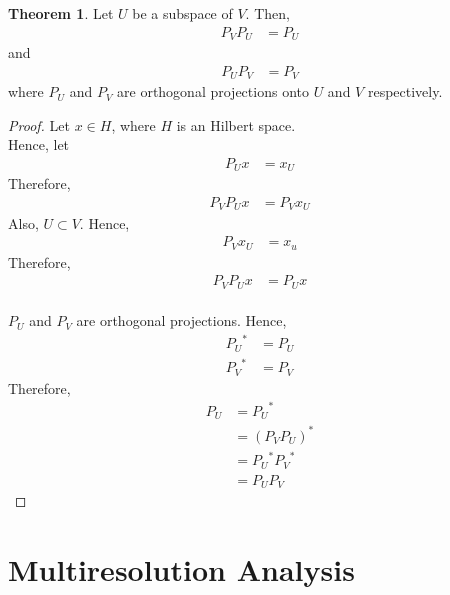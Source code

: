\documentclass[titlepage, fleqn, a4paper, 12pt, twoside]{article}
\theoremstyle{definition}
\theoremstyle{theorem}
\newtheorem{theorem}{Theorem}
\begin{document}
\begin{theorem}
	Let $U$ be a subspace of $V$.
	Then,
	\begin{align*}
		P_V P_U &= P_U
	\end{align*}
	and
	\begin{align*}
		P_U P_V &= P_V
	\end{align*}
	where $P_U$ and $P_V$ are orthogonal projections onto $U$ and $V$ respectively.
\end{theorem}

\begin{proof}
	Let $x \in H$, where $H$ is an Hilbert space.\\
	Hence, let
	\begin{align*}
		P_U x &= x_U
	\end{align*}
	Therefore,
	\begin{align*}
		P_V P_U x &= P_V x_U
	\end{align*}
	Also, $U \subset V$.
	Hence,
	\begin{align*}
		P_V x_U &= x_u
	\end{align*}
	Therefore,
	\begin{align*}
		P_V P_U x &= P_U x
	\end{align*}
	~\\
	$P_U$ and $P_V$ are orthogonal projections.
	Hence,
	\begin{align*}
		{P_U}^* &= P_U\\
		{P_V}^* &= P_V
	\end{align*}
	Therefore,
	\begin{align*}
		P_U &= {P_U}^*\\
		&= (P_V P_U)^*\\
		&= {P_U}^* {P_V}^*\\
		&= P_U P_V
	\end{align*}
\end{proof}

\section{Multiresolution Analysis}
\end{document}
